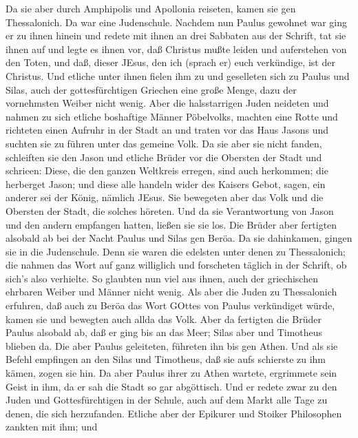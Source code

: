  Da sie aber durch Amphipolis und Apollonia reiseten, kamen
sie gen Thessalonich. Da war eine Judenschule.  Nachdem nun
Paulus gewohnet war ging er zu ihnen hinein und redete mit ihnen an drei
Sabbaten aus der Schrift,  tat sie ihnen auf und legte es
ihnen vor, daß Christus mußte leiden und auferstehen von den Toten, und
daß, dieser JEsus, den ich (sprach er) euch verkündige, ist der
Christus.  Und etliche unter ihnen fielen ihm zu und
geselleten sich zu Paulus und Silas, auch der gottesfürchtigen Griechen
eine große Menge, dazu der vornehmsten Weiber nicht wenig. 
Aber die halsstarrigen Juden neideten und nahmen zu sich etliche
boshaftige Männer Pöbelvolks, machten eine Rotte und richteten einen
Aufruhr in der Stadt an und traten vor das Haus Jasons und suchten sie
zu führen unter das gemeine Volk.  Da sie aber sie nicht
fanden, schleiften sie den Jason und etliche Brüder vor die Obersten der
Stadt und schrieen: Diese, die den ganzen Weltkreis erregen, sind auch
herkommen;  die herberget Jason; und diese alle handeln
wider des Kaisers Gebot, sagen, ein anderer sei der König, nämlich
JEsus.  Sie bewegeten aber das Volk und die Obersten der
Stadt, die solches höreten.  Und da sie Verantwortung von
Jason und den andern empfangen hatten, ließen sie sie los. 
Die Brüder aber fertigten alsobald ab bei der Nacht Paulus und Silas gen
Beröa. Da sie dahinkamen, gingen sie in die Judenschule. 
Denn sie waren die edelsten unter denen zu Thessalonich; die nahmen das
Wort auf ganz williglich und forscheten täglich in der Schrift, ob
sich's also verhielte.  So glaubten nun viel aus ihnen,
auch der griechischen ehrbaren Weiber und Männer nicht wenig.
 Als aber die Juden zu Thessalonich erfuhren, daß auch zu
Beröa das Wort GOttes von Paulus verkündiget würde, kamen sie und
bewegten auch allda das Volk.  Aber da fertigten die Brüder
Paulus alsobald ab, daß er ging bis an das Meer; Silas aber und
Timotheus blieben da.  Die aber Paulus geleiteten, führeten
ihn bis gen Athen. Und als sie Befehl empfingen an den Silas und
Timotheus, daß sie aufs schierste zu ihm kämen, zogen sie hin.
 Da aber Paulus ihrer zu Athen wartete, ergrimmete sein
Geist in ihm, da er sah die Stadt so gar abgöttisch.  Und
er redete zwar zu den Juden und Gottesfürchtigen in der Schule, auch auf
dem Markt alle Tage zu denen, die sich herzufanden. 
Etliche aber der Epikurer und Stoiker Philosophen zankten mit ihm; und
